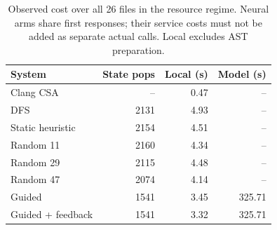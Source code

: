 \begin{table}[t]\centering\small
\caption{Observed cost over all 26 files in the resource regime. Neural arms share first responses; their service costs must not be added as separate actual calls. Local excludes AST preparation.}\label{tab:v3-cost}
\begin{tabular}{lrrr}\toprule System&State pops&Local (s)&Model (s)\\\midrule
Clang CSA & -- & 0.47 & --\\
DFS & 2131 & 4.93 & --\\
Static heuristic & 2154 & 4.51 & --\\
Random 11 & 2160 & 4.34 & --\\
Random 29 & 2115 & 4.48 & --\\
Random 47 & 2074 & 4.14 & --\\
Guided & 1541 & 3.45 & 325.71\\
Guided + feedback & 1541 & 3.32 & 325.71\\
\bottomrule\end{tabular}\end{table}
